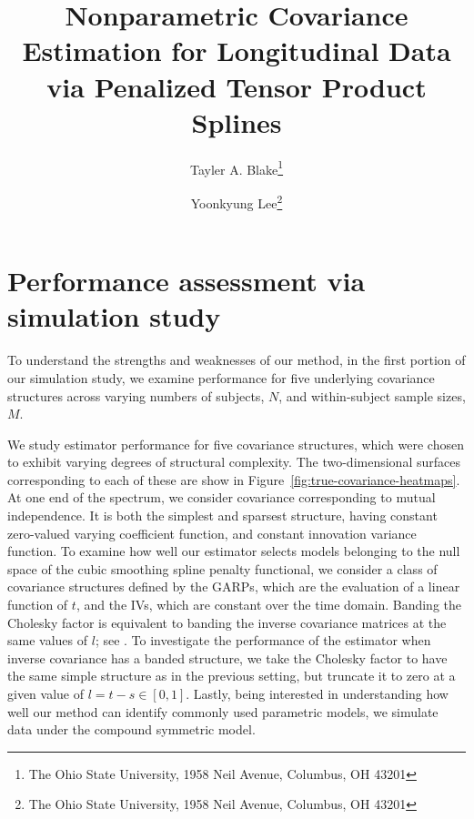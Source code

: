 \documentclass[12pt]{article}
\theoremstyle{definition}
\def\bL{\mathbf{L}}
\begin{document}
\def\bL{\mathbf{L}}



\title{ Nonparametric Covariance Estimation for Longitudinal Data via Penalized Tensor Product Splines}

\author{Tayler A. Blake\thanks{The Ohio State University, 1958 Neil Avenue, Columbus, OH 43201} \and  Yoonkyung Lee\thanks{The Ohio State University, 1958 Neil Avenue, Columbus, OH 43201}}


\maketitle

\section{Performance assessment via simulation study} 


To understand the strengths and weaknesses of our method, in the first portion of our simulation study, we examine performance for five underlying covariance structures across varying numbers of subjects, $N$, and within-subject sample sizes, $M$.

\bigskip

We study estimator performance for five covariance structures, which were chosen to exhibit varying degrees of structural complexity. The two-dimensional surfaces corresponding to each of these are show in Figure~\ref{fig:true-covariance-heatmaps}. At one end of the spectrum, we consider covariance corresponding to mutual independence. It is both the simplest and sparsest structure, having constant zero-valued varying coefficient function, and constant innovation variance function. To examine how well our estimator selects models belonging to the null space of the cubic smoothing spline penalty functional, we consider a class of covariance structures defined by the GARPs, which are the evaluation of a linear function of $t$, and the IVs, which are constant over the time domain. Banding the Cholesky factor is equivalent to banding the inverse covariance matrices at the same values of $l$; see \citet{bickel2008regularized}.  To investigate the performance of the estimator when inverse covariance has a banded structure, we take the Cholesky factor to have the same simple structure as in the previous setting, but truncate it to zero at a given value of $l = t - s \in \left[0,1\right]$. Lastly, being interested in understanding how well our method can identify commonly used parametric models, we simulate data under the compound symmetric model. 
\end{document}
